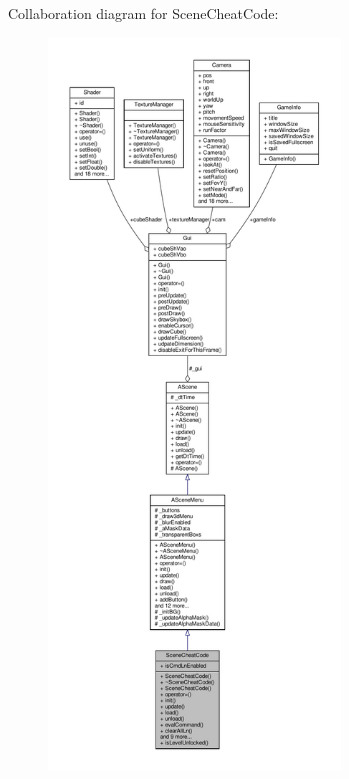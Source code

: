 Collaboration diagram for Scene\+Cheat\+Code\+:
\nopagebreak
\begin{figure}[H]
\begin{center}
\leavevmode
\includegraphics[height=550pt]{class_scene_cheat_code__coll__graph}
\end{center}
\end{figure}
